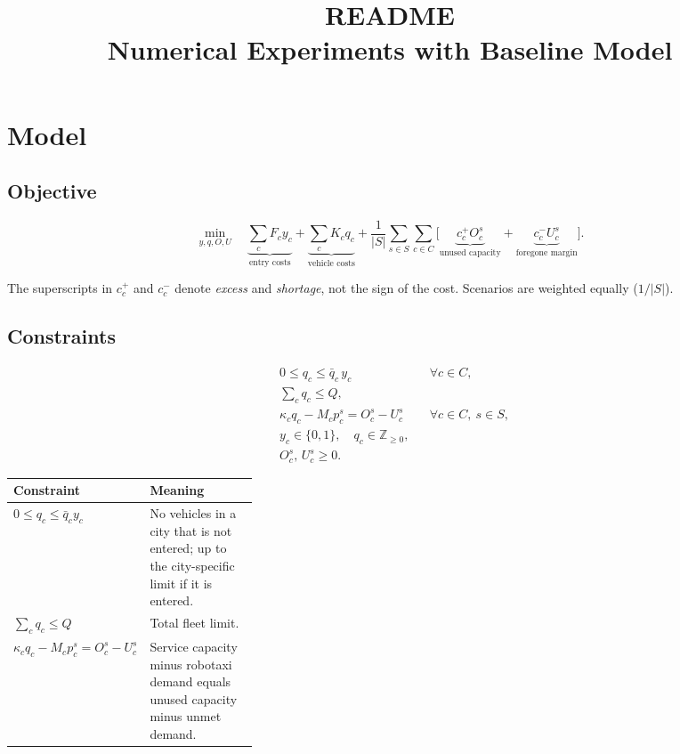 \documentclass[10pt,a4paper]{article}
\title{\textbf{README}\\[2pt]\large Numerical Experiments with Baseline Model}
\date{}
\begin{document}
\maketitle
\vspace{-12mm}

\section{Model}

\subsection{Objective}

\[
\min_{y,q,O,U}\quad
\underbrace{\sum_{c} F_c y_c}_{\text{entry costs}}
+\underbrace{\sum_{c} K_c q_c}_{\text{vehicle costs}}
+\frac{1}{|S|}\sum_{s\in S}\sum_{c\in C}\Big[
\underbrace{c_c^{+}O_c^{s}}_{\text{unused capacity}}
+\underbrace{c_c^{-}U_c^{s}}_{\text{foregone margin}}
\Big].
\]

The superscripts in $c_c^{+}$ and $c_c^{-}$ denote \emph{excess} and \emph{shortage},
not the sign of the cost. Scenarios are weighted equally ($1/|S|$).

\subsection{Constraints}

\[
\begin{aligned}
&0\le q_c\le \bar q_c\, y_c && \forall c\in C,\\
&\textstyle\sum_{c} q_c\le Q, &&\\
&\kappa_c q_c - M_c p_c^{s} = O_c^{s}-U_c^{s} && \forall c\in C,\ s\in S,\\
&y_c\in\{0,1\},\quad q_c\in\mathbb{Z}_{\ge 0}, &&\\
&O_c^{s},\,U_c^{s}\ge 0. &&
\end{aligned}
\]

{\small
\begin{tabularx}{\linewidth}{@{}>{\raggedright\arraybackslash}p{0.32\linewidth}Y@{}}
\toprule
Constraint & Meaning \\ \midrule
$0\le q_c\le\bar q_c y_c$ & No vehicles in a city that is not entered; up to the city-specific limit if it is entered. \\
$\sum_c q_c\le Q$ & Total fleet limit. \\
$\kappa_c q_c-M_c p_c^s=O_c^s-U_c^s$ & Service capacity minus robotaxi demand equals unused capacity minus unmet demand. \\
\bottomrule
\end{tabularx}
}
\end{document}
